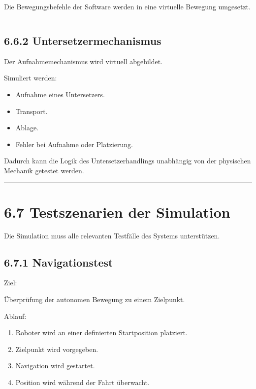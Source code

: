 \documentclass[
]{article}
\providecommand{\tightlist}{%
  \setlength{\itemsep}{0pt}\setlength{\parskip}{0pt}}
\begin{document}
Die Bewegungsbefehle der Software werden in eine virtuelle Bewegung
umgesetzt.

\begin{center}\rule{0.5\linewidth}{0.5pt}\end{center}

\subsection{6.6.2 Untersetzermechanismus}\label{untersetzermechanismus}

Der Aufnahmemechanismus wird virtuell abgebildet.

Simuliert werden:

\begin{itemize}
\tightlist
\item
  Aufnahme eines Untersetzers.
\item
  Transport.
\item
  Ablage.
\item
  Fehler bei Aufnahme oder Platzierung.
\end{itemize}

Dadurch kann die Logik des Untersetzerhandlings unabhängig von der
physischen Mechanik getestet werden.

\begin{center}\rule{0.5\linewidth}{0.5pt}\end{center}

\section{6.7 Testszenarien der
Simulation}\label{testszenarien-der-simulation}

Die Simulation muss alle relevanten Testfälle des Systems unterstützen.

\subsection{6.7.1 Navigationstest}\label{navigationstest}

Ziel:

Überprüfung der autonomen Bewegung zu einem Zielpunkt.

Ablauf:

\begin{enumerate}
\def\labelenumi{\arabic{enumi}.}
\tightlist
\item
  Roboter wird an einer definierten Startposition platziert.
\item
  Zielpunkt wird vorgegeben.
\item
  Navigation wird gestartet.
\item
  Position wird während der Fahrt überwacht.
\end{enumerate}
\end{document}
